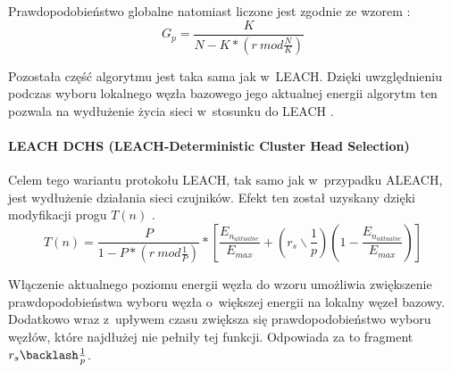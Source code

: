 Prawdopodobieństwo globalne natomiast liczone jest zgodnie ze wzorem \cite{Ali2008}:
\[
	G_{p} = \frac{K}{N - K * (r \:mod \frac{N}{K})}
\]

Pozostała część algorytmu jest taka sama jak w~LEACH. Dzięki uwzględnieniu podczas wyboru lokalnego węzła bazowego jego aktualnej energii algorytm ten pozwala na wydłużenie życia sieci w~stosunku do LEACH \cite{Singh2017}.
\paragraph{LEACH DCHS (LEACH-Deterministic Cluster Head Selection)}
Celem tego wariantu protokołu LEACH, tak samo jak w~przypadku ALEACH, jest wydłużenie działania sieci czujników. Efekt ten został uzyskany dzięki modyfikacji progu $T(n)$ \cite{Handy2002, Singh2017}.
 \[
	T(n) =  \frac{P}{1 - P * (r \:mod \frac{1}{P})} * \left[\frac{E_{n_{aktualne}}}{E_{max}} + \left(r_{s} \backslash \frac{1}{p}\right)\left(1 - \frac{E_{n_{aktualne}}}{E_{max}}\right)\right]
\]

Włączenie aktualnego poziomu energii węzła do wzoru umożliwia zwiększenie prawdopodobieństwa wyboru węzła o~większej energii na lokalny węzeł bazowy. Dodatkowo wraz z~upływem czasu zwiększa się prawdopodobieństwo wyboru węzłów, które najdłużej nie pełniły tej funkcji. Odpowiada za to fragment $r_{s} \backlash \frac{1}{p}$.